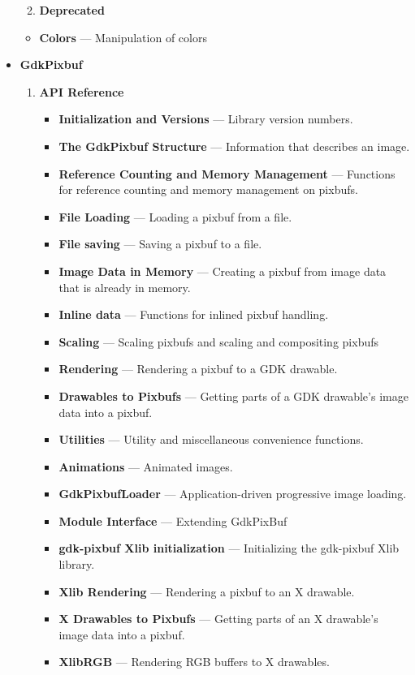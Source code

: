 \documentclass[12pt]{article}
\begin{document}
\begin{itemize}
\begin{enumerate}[I]
\begin{itemize}
\end{itemize}

\item \textbf{Deprecated}

\end{enumerate}

\begin{itemize}

\item \textbf{Colors} — Manipulation of colors



\end{itemize}

\item \textbf{GdkPixbuf}

\begin{enumerate}[I]

\item \textbf{API Reference}

\begin{itemize}

\item \textbf{Initialization and Versions} — Library version numbers.
\item \textbf{The GdkPixbuf Structure} — Information that describes an image.
\item \textbf{Reference Counting and Memory Management} — Functions for reference counting and memory management on pixbufs.
\item \textbf{File Loading} — Loading a pixbuf from a file.
\item \textbf{File saving} — Saving a pixbuf to a file.
\item \textbf{Image Data in Memory} — Creating a pixbuf from image data that is already in memory.
\item \textbf{Inline data} — Functions for inlined pixbuf handling.
\item \textbf{Scaling} — Scaling pixbufs and scaling and compositing pixbufs
\item \textbf{Rendering} — Rendering a pixbuf to a GDK drawable.
\item \textbf{Drawables to Pixbufs} — Getting parts of a GDK drawable's image data into a pixbuf.
\item \textbf{Utilities} — Utility and miscellaneous convenience functions.
\item \textbf{Animations} — Animated images.
\item \textbf{GdkPixbufLoader} — Application-driven progressive image loading.
\item \textbf{Module Interface} — Extending GdkPixBuf
\item \textbf{gdk-pixbuf Xlib initialization} — Initializing the gdk-pixbuf Xlib library.
\item \textbf{Xlib Rendering} — Rendering a pixbuf to an X drawable.
\item \textbf{X Drawables to Pixbufs} — Getting parts of an X drawable's image data into a pixbuf.
\item \textbf{XlibRGB} — Rendering RGB buffers to X drawables.




\end{itemize}
\end{enumerate}
\end{itemize}
\end{document}
